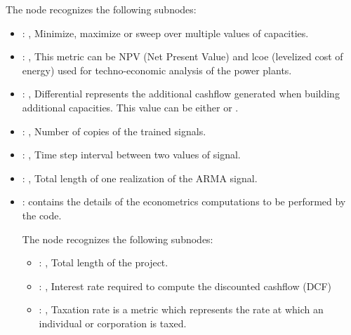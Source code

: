   The  node recognizes the following subnodes:
  \begin{itemize}
    \item {}: , 
      Minimize, maximize or sweep over multiple values of capacities.

    \item {}: , 
      This metric can be NPV (Net Present Value) and lcoe (levelized cost of energy) used for
      techno-economic analysis of the power plants.

    \item {}: , 
      Differential represents the additional cashflow generated when building additional capacities.
      This value can be either  or .

    \item {}: , 
      Number of copies of the trained signals.

    \item {}: , 
      Time step interval between two values of signal.

    \item {}: , 
      Total length of one realization of the ARMA signal.

    \item {}:
       contains the details of the econometrics     computations to be performed
      by the code.

      The  node recognizes the following subnodes:
      \begin{itemize}
        \item {}: , 
          Total length of the project.

        \item {}: , 
          Interest rate required to compute the discounted cashflow (DCF)

        \item {}: , 
          Taxation rate is a metric which represents the      rate at which an individual or
          corporation is taxed.


\end{itemize}
\end{itemize}
